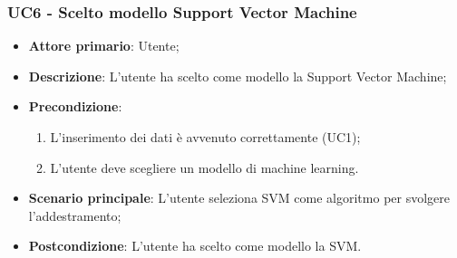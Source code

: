 \subsubsection{UC6 - Scelto modello Support Vector Machine}%
\label{sssec:uc6}
\begin{itemize}
  \item \textbf{Attore primario}: Utente;
  \item \textbf{Descrizione}: L'utente ha scelto come modello la Support Vector Machine;
  \item \textbf{Precondizione}:
  \begin{enumerate}
    \item L'inserimento dei dati è avvenuto correttamente (UC1);
    \item L'utente deve scegliere un modello di machine learning.
  \end{enumerate}
  \item \textbf{Scenario principale}: L'utente seleziona SVM come algoritmo per svolgere l'addestramento;
  \item \textbf{Postcondizione}: L'utente ha scelto come modello la SVM.
\end{itemize}
